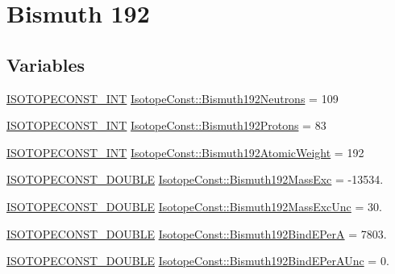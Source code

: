 \hypertarget{group___isotope_const-_bismuth-_bi192}{}\section{Bismuth 192}
\label{group___isotope_const-_bismuth-_bi192}
\subsection*{Variables}
\begin{DoxyCompactItemize}
\item 
\mbox{\hyperlink{group___isotope_const-_macros_ga5f18360b3e99483a35c32d789e62621c}{I\+S\+O\+T\+O\+P\+E\+C\+O\+N\+S\+T\+\_\+\+I\+NT}} \mbox{\hyperlink{group___isotope_const-_bismuth-_bi192_gaf7d7ef908adb7b7f2f03a9b818cdbb5b}{Isotope\+Const\+::\+Bismuth192\+Neutrons}} = 109
\item 
\mbox{\hyperlink{group___isotope_const-_macros_ga5f18360b3e99483a35c32d789e62621c}{I\+S\+O\+T\+O\+P\+E\+C\+O\+N\+S\+T\+\_\+\+I\+NT}} \mbox{\hyperlink{group___isotope_const-_bismuth-_bi192_ga5512c398a987a8fbcb070f361d824692}{Isotope\+Const\+::\+Bismuth192\+Protons}} = 83
\item 
\mbox{\hyperlink{group___isotope_const-_macros_ga5f18360b3e99483a35c32d789e62621c}{I\+S\+O\+T\+O\+P\+E\+C\+O\+N\+S\+T\+\_\+\+I\+NT}} \mbox{\hyperlink{group___isotope_const-_bismuth-_bi192_ga826a1d76b88c422c8ec646736fc191af}{Isotope\+Const\+::\+Bismuth192\+Atomic\+Weight}} = 192
\item 
\mbox{\hyperlink{group___isotope_const-_macros_ga8f45a7272ce02c0b4c65c44636ed719a}{I\+S\+O\+T\+O\+P\+E\+C\+O\+N\+S\+T\+\_\+\+D\+O\+U\+B\+LE}} \mbox{\hyperlink{group___isotope_const-_bismuth-_bi192_ga95faa38d53a3c7d27e592b1128a74e06}{Isotope\+Const\+::\+Bismuth192\+Mass\+Exc}} = -\/13534.
\item 
\mbox{\hyperlink{group___isotope_const-_macros_ga8f45a7272ce02c0b4c65c44636ed719a}{I\+S\+O\+T\+O\+P\+E\+C\+O\+N\+S\+T\+\_\+\+D\+O\+U\+B\+LE}} \mbox{\hyperlink{group___isotope_const-_bismuth-_bi192_ga56ada8fce06e22402a8c2902fcb6796a}{Isotope\+Const\+::\+Bismuth192\+Mass\+Exc\+Unc}} = 30.
\item 
\mbox{\hyperlink{group___isotope_const-_macros_ga8f45a7272ce02c0b4c65c44636ed719a}{I\+S\+O\+T\+O\+P\+E\+C\+O\+N\+S\+T\+\_\+\+D\+O\+U\+B\+LE}} \mbox{\hyperlink{group___isotope_const-_bismuth-_bi192_gaf3312105a41ae47b06c1866145d52aa2}{Isotope\+Const\+::\+Bismuth192\+Bind\+E\+PerA}} = 7803.
\item 
\mbox{\hyperlink{group___isotope_const-_macros_ga8f45a7272ce02c0b4c65c44636ed719a}{I\+S\+O\+T\+O\+P\+E\+C\+O\+N\+S\+T\+\_\+\+D\+O\+U\+B\+LE}} \mbox{\hyperlink{group___isotope_const-_bismuth-_bi192_gad6c7b7ec1c56e00a0331706ac4cfe8dd}{Isotope\+Const\+::\+Bismuth192\+Bind\+E\+Per\+A\+Unc}} = 0.

\end{DoxyCompactItemize}
